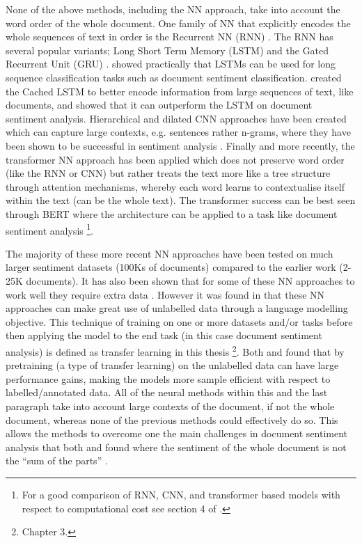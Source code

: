 None of the above methods, including the NN approach, take into account the word order of the whole document. One family of NN that explicitly encodes the whole sequences of text in order is the Recurrent NN (RNN) \citep{rumelhart1985learning}. The RNN has several popular variants; Long Short Term Memory (LSTM) \citep{hochreiter1997long} and the Gated Recurrent Unit (GRU) \citep{cho-etal-2014-learning}. \citet{dai2015semi} showed practically that LSTMs can be used for long sequence classification tasks such as document sentiment classification. \citet{xu-etal-2016-cached} created the Cached LSTM to better encode information from large sequences of text, like documents, and showed that it can outperform the LSTM on document sentiment analysis. Hierarchical \citep{zhang2015character} and dilated \citep{strubell-etal-2017-fast} CNN approaches have been created which can capture large contexts, e.g. sentences rather n-grams, where they have been shown to be successful in sentiment analysis \citep{conneau-etal-2017-deep}. Finally and more recently, the transformer NN \citep{vaswani2017attention} approach has been applied which does not preserve word order (like the RNN or CNN) but rather treats the text more like a tree structure through attention mechanisms, whereby each word learns to contextualise itself within the text (can be the whole text). The transformer success can be best seen through BERT \citep{devlin-etal-2019-bert} where the architecture can be applied to a task like document sentiment analysis \citep{sun2019fine}\footnote{For a good comparison of RNN, CNN, and transformer based models with respect to computational cost see section 4 of \citet{vaswani2017attention}.}. 

The majority of these more recent NN approaches have been tested on much larger sentiment datasets (100Ks of documents) compared to the earlier work (2-25K documents). It has also been shown that for some of these NN approaches to work well they require extra data \citep{dai2015semi}. However it was found in \citet{dai2015semi} that these NN approaches can make great use of unlabelled data through a language modelling objective. This technique of training on one or more datasets and/or tasks before then applying the model to the end task (in this case document sentiment analysis) is defined as transfer learning in this thesis \citep{ruder2019neural}\footnote{Chapter 3.}.  Both \citet{howard-ruder-2018-universal} and \citet{sun2019fine} found that by pretraining (a type of transfer learning) on the unlabelled data can have large performance gains, making the models more sample efficient with respect to labelled/annotated data. All of the neural methods within this and the last paragraph take into account large contexts of the document, if not the whole document, whereas none of the previous methods could effectively do so. This allows the methods to overcome one the main challenges in document sentiment analysis that both \citet{turney-2002-thumbs} and \citet{pang-etal-2002-thumbs} found where the sentiment of the whole document is not the ``sum of the parts'' \citep{turney-2002-thumbs}.

